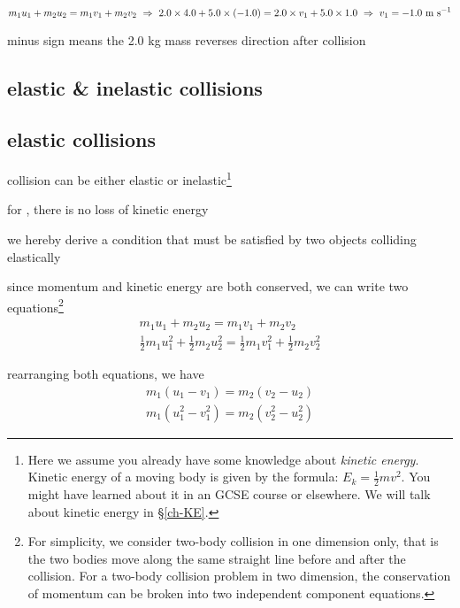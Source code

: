 \begin{soln}\begin{equation*}
m_1 u_1 + m_2 u_2 = m_1 v_1 + m_2 v_2 \, \, \Rightarrow \, \, 2.0\times4.0+5.0\times(-1.0) = 2.0 \times v_1 + 5.0\times1.0 \, \, \Rightarrow \, \,  v_1 = -1.0 \text{ m s$^{-1}$}
\end{equation*}

minus sign means the 2.0 kg mass reverses direction after collision \end{soln}

\subsection{elastic \& inelastic collisions}

\subsection*{elastic collisions}

collision can be either elastic or inelastic\footnote{Here we assume you already have some knowledge about \emph{kinetic energy}. Kinetic energy of a moving body is given by the formula: $E_k = \frac{1}{2}mv^2$. You might have learned about it in an GCSE course or elsewhere. We will talk about kinetic energy in \S\ref{ch-KE}.}

\begin{ilight}
	for , there is no loss of kinetic energy
\end{ilight}



we hereby derive a condition that must be satisfied by two objects colliding elastically

since momentum and kinetic energy are both conserved, we can write two equations\footnote{For simplicity, we consider two-body collision in one dimension only, that is the two bodies move along the same straight line before and after the collision. For a two-body collision problem in two dimension, the conservation of momentum can be broken into two independent component equations.}
\begin{gather*}
	{ m_1 u_1 + m_2 u_2 = m_1 v_1 + m_2 v_2 }\\
	{ \frac{1}{2}m_1 u_1^2 + \frac{1}{2}m_2 u_2^2 = \frac{1}{2}m_1 v_1^2 + \frac{1}{2}m_2 v_2^2  }
\end{gather*}

rearranging both equations, we have
\begin{gather}
m_1 (u_1 - v_1) = m_2 (v_2 - u_2) \tag{1}\\
m_1 (u_1^2 - v_1^2) = m_2 (v_2^2 - u_2^2)  \tag{2}
\end{gather}

